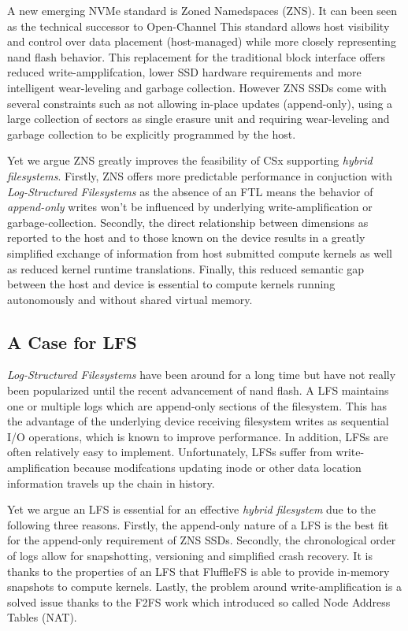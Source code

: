 A new emerging NVMe standard is Zoned Namedspaces (ZNS). It can been seen as the
technical successor to Open-Channel %
This standard allows host visibility and control over data placement
(host-managed) while more closely representing nand flash behavior. This
replacement for the traditional block interface offers reduced
write-ampplifcation, lower SSD hardware requirements and more intelligent
wear-leveling and garbage collection. However ZNS SSDs come with several
constraints such as not allowing in-place updates (append-only), using a large
collection of sectors as single erasure unit and requiring wear-leveling and
garbage collection to be explicitly programmed by the host.

Yet we argue ZNS greatly improves the feasibility of CSx supporting
\textit{hybrid filesystems}. Firstly, ZNS offers more predictable performance in
conjuction with \textit{Log-Structured Filesystems} as the absence of an FTL
means the behavior of \textit{append-only} writes won't be influenced by
underlying write-amplification or garbage-collection. Secondly, the direct
relationship between dimensions as reported to the host and to those known on
the device results in a greatly simplified exchange of information from host
submitted compute kernels as well as reduced kernel runtime translations.
Finally, this reduced semantic gap between the host and device is essential to
compute kernels running autonomously and without shared virtual memory.

\subsection*{A Case for LFS}

\textit{Log-Structured Filesystems} have been around for a long
time \cite{Rosenblum1992TheDA} but have not really been popularized until the
recent advancement of nand flash. A LFS maintains one or multiple logs which
are append-only sections of the filesystem. This has the advantage of the
underlying device receiving filesystem writes as sequential I/O operations,
which is known to improve performance. In addition, LFSs are often relatively
easy to implement. Unfortunately, LFSs suffer from write-amplification because
modifcations updating inode or other data location information travels up the
chain in history.

Yet we argue an LFS is essential for an effective \textit{hybrid filesystem} due
to the following three reasons. Firstly, the append-only nature of a LFS is the
best fit for the append-only requirement of ZNS SSDs. Secondly, the
chronological order of logs allow for snapshotting, versioning and simplified
crash recovery. It is thanks to the properties of an LFS that FluffleFS is able
to provide in-memory snapshots to compute kernels. Lastly, the problem around
write-amplification is a solved issue thanks to the F2FS \cite{Lee2015F2FSAN}
work which introduced so called Node Address Tables (NAT).


